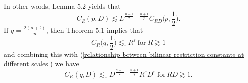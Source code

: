 \documentclass[11pt]{amsart}
\numberwithin{equation}{section}
\begin{document}
\noindent 
In other words, Lemma 5.2 yields that
\begin{equation} \label{relationship between bilinear restriction constants at different scales}
    C_{R}(p, D) \lesssim D^{\frac{n-1}{2} - \frac{n+1}{p}}C_{RD}\Big(p, \frac{1}{2}\Big).
\end{equation}
If $q = \frac{2(n+2)}{n}$, then Theorem 5.1 implies that 
\begin{equation}
    C_{R}\Big(q, \frac{1}{2}\Big) \lesssim_{\varepsilon} R^{\varepsilon} \ \text{for} \ R \gtrsim 1
\end{equation}
and combining this with (\ref{relationship between bilinear restriction constants at different scales}) we have
\begin{equation} \label{estimating constant at spatial scale R and freq distance D}
    C_{R}(q, D) \lesssim_{\varepsilon} D^{\frac{n-1}{2} - \frac{n+1}{q}} R^{\varepsilon}D^{\varepsilon} \ \text{for} \ RD \gtrsim 1.
\end{equation}
\end{document}

